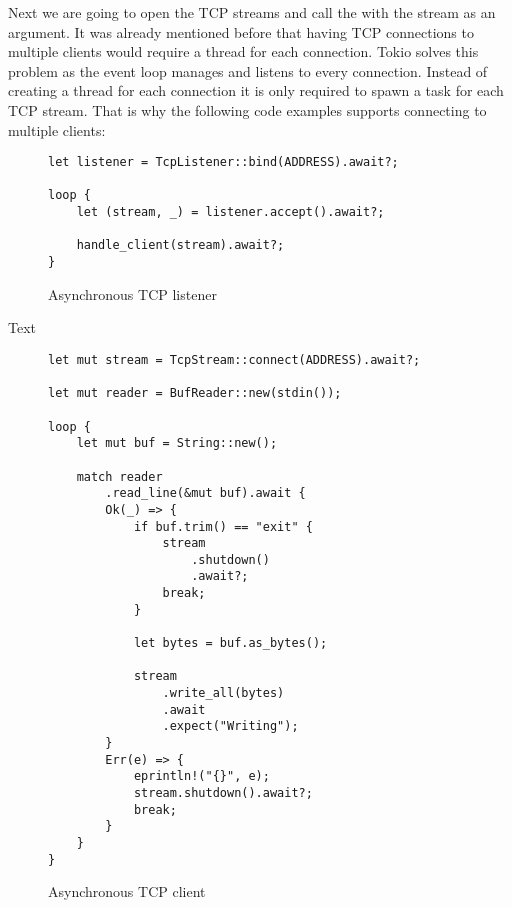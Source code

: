 Next we are going to open the TCP streams and call the  with the stream as an argument. It was
already mentioned before that having TCP connections to multiple clients would require a thread for each connection.
Tokio solves this problem as the event loop manages and listens to every connection. Instead of creating a thread for
each connection it is only required to spawn a task for each TCP stream. That is why the following code examples
supports connecting to multiple clients:

\begin{figure}[h]
    \begin{verbatim}
let listener = TcpListener::bind(ADDRESS).await?;

loop {
    let (stream, _) = listener.accept().await?;

    handle_client(stream).await?;
}
    \end{verbatim}
    \caption{Asynchronous TCP listener}
\end{figure}

Text

\begin{figure}[h]
    \begin{verbatim}
let mut stream = TcpStream::connect(ADDRESS).await?;

let mut reader = BufReader::new(stdin());

loop {
    let mut buf = String::new();

    match reader
        .read_line(&mut buf).await {
        Ok(_) => {
            if buf.trim() == "exit" {
                stream
                    .shutdown()
                    .await?;
                break;
            }

            let bytes = buf.as_bytes();

            stream
                .write_all(bytes)
                .await
                .expect("Writing");
        }
        Err(e) => {
            eprintln!("{}", e);
            stream.shutdown().await?;
            break;
        }
    }
}
    \end{verbatim}
    \caption{Asynchronous TCP client}
\end{figure}
